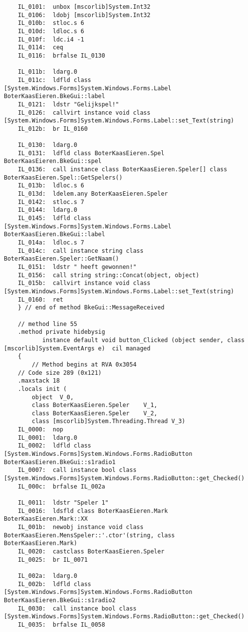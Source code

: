 \begin{lstlisting}
	IL_0101:  unbox [mscorlib]System.Int32
	IL_0106:  ldobj [mscorlib]System.Int32
	IL_010b:  stloc.s 6
	IL_010d:  ldloc.s 6
	IL_010f:  ldc.i4 -1
	IL_0114:  ceq 
	IL_0116:  brfalse IL_0130

	IL_011b:  ldarg.0 
	IL_011c:  ldfld class [System.Windows.Forms]System.Windows.Forms.Label BoterKaasEieren.BkeGui::label
	IL_0121:  ldstr "Gelijkspel!"
	IL_0126:  callvirt instance void class [System.Windows.Forms]System.Windows.Forms.Label::set_Text(string)
	IL_012b:  br IL_0160

	IL_0130:  ldarg.0 
	IL_0131:  ldfld class BoterKaasEieren.Spel BoterKaasEieren.BkeGui::spel
	IL_0136:  call instance class BoterKaasEieren.Speler[] class BoterKaasEieren.Spel::GetSpelers()
	IL_013b:  ldloc.s 6
	IL_013d:  ldelem.any BoterKaasEieren.Speler
	IL_0142:  stloc.s 7
	IL_0144:  ldarg.0 
	IL_0145:  ldfld class [System.Windows.Forms]System.Windows.Forms.Label BoterKaasEieren.BkeGui::label
	IL_014a:  ldloc.s 7
	IL_014c:  call instance string class BoterKaasEieren.Speler::GetNaam()
	IL_0151:  ldstr " heeft gewonnen!"
	IL_0156:  call string string::Concat(object, object)
	IL_015b:  callvirt instance void class [System.Windows.Forms]System.Windows.Forms.Label::set_Text(string)
	IL_0160:  ret 
    } // end of method BkeGui::MessageReceived

    // method line 55
    .method private hidebysig 
           instance default void button_Clicked (object sender, class [mscorlib]System.EventArgs e)  cil managed 
    {
        // Method begins at RVA 0x3054
	// Code size 289 (0x121)
	.maxstack 18
	.locals init (
		object	V_0,
		class BoterKaasEieren.Speler	V_1,
		class BoterKaasEieren.Speler	V_2,
		class [mscorlib]System.Threading.Thread	V_3)
	IL_0000:  nop 
	IL_0001:  ldarg.0 
	IL_0002:  ldfld class [System.Windows.Forms]System.Windows.Forms.RadioButton BoterKaasEieren.BkeGui::s1radio1
	IL_0007:  call instance bool class [System.Windows.Forms]System.Windows.Forms.RadioButton::get_Checked()
	IL_000c:  brfalse IL_002a

	IL_0011:  ldstr "Speler 1"
	IL_0016:  ldsfld class BoterKaasEieren.Mark BoterKaasEieren.Mark::XX
	IL_001b:  newobj instance void class BoterKaasEieren.MensSpeler::'.ctor'(string, class BoterKaasEieren.Mark)
	IL_0020:  castclass BoterKaasEieren.Speler
	IL_0025:  br IL_0071

	IL_002a:  ldarg.0 
	IL_002b:  ldfld class [System.Windows.Forms]System.Windows.Forms.RadioButton BoterKaasEieren.BkeGui::s1radio2
	IL_0030:  call instance bool class [System.Windows.Forms]System.Windows.Forms.RadioButton::get_Checked()
	IL_0035:  brfalse IL_0058


\end{lstlisting}
